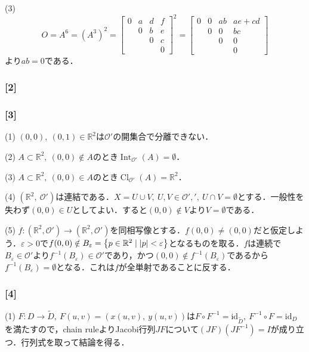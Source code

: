 \documentclass[a4j]{ltjsarticle}
\newcommand{\Rset}{\mathbb{R}}
\newcommand{\1}{\mathbbm{1}}
\DeclareMathOperator*{\interior}{\mathrm{Int}}
\DeclareMathOperator*{\closure}{\mathrm{Cl}}
\numberwithin{equation}{section}
\theoremstyle{definition}
\begin{document}
(3) 
\begin{equation}
    O=A^6=(A^3)^2=\begin{bmatrix}
        0 & a & d & f \\
          & 0 & b & e \\
          &   & 0 & c \\
          &   &   & 0 
    \end{bmatrix}^2=\begin{bmatrix}
        0 & 0 & ab & ae+cd \\
          & 0 & 0  & bc \\
          &   & 0  & 0 \\
          &   &    & 0 
    \end{bmatrix}
\end{equation}
より$ab=0$である．

\subsubsection*{[2]}

\subsubsection*{[3]}
(1) $(0,0),\ (0,1)\in\Rset^2$は$\mathcal{O}'$の開集合で分離できない．

(2) $A\subset\Rset^2,\ (0,0)\notin A$のとき$\interior_{\mathcal{O}'}(A)=\emptyset$．

(3) $A\subset \Rset^2,\ (0,0)\in A$のとき$\closure_{\mathcal{O}'}(A)=\Rset^2$．

(4) $(\Rset^2,\ \mathcal{O}')$は連結である．$X=U\cup V,\ U,V\in\mathcal{O}',',\ U\cap V=\emptyset$とする．一般性を失わず$(0,0)\in U$としてよい．すると$(0,0)\notin V$より$V=\emptyset$である．

(5) $f\colon (\Rset^2,\mathcal{O}')\to(\Rset^2,\mathcal{O}')$を同相写像とする．$f(0,0)\neq(0,0)$だと仮定しよう．$\varepsilon>0$で$f(0,0)\notin B_\varepsilon=\qty{p\in \Rset^2\mid \abs{p}<\varepsilon}$となるものを取る．$f$は連続で$B_{\varepsilon}\in\mathcal{O}'$より$f^{-1}(B_{\varepsilon})\in\mathcal{O}'$であり，かつ$(0,0)\notin f^{-1}(B_{\varepsilon})$であるから$f^{-1}(B_{\varepsilon})=\emptyset$となる．これは$f$が全単射であることに反する．

\subsubsection*{[4]}
(1) $F\colon D\to \widetilde{D},\ F(u,v)=(x(u,v),\ y(u,v))$は$F\circ F^{-1}=\mathrm{id}_{\widetilde{D}},\ F^{-1}\circ F=\mathrm{id}_{D}$を満たすので，chain ruleよりJacobi行列$JF$について$(JF)(JF^{-1})=I$が成り立つ．行列式を取って結論を得る．
\end{document}
